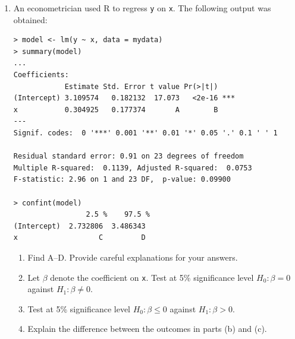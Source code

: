\documentclass[12pt]{article}
\begin{document}
\begin{enumerate}
\begin{verbatim}
> confint(model)
                  2.5 %     97.5 %
(Intercept)   5.084078   5.638654
ln_alcohol   -0.611437  -0.095217
\end{verbatim}
\normalsize
\begin{enumerate}
\item  Several entries in the output were replaced with letters. Find A--D if the number of observations was 21.
 Provide careful explanations for your answers.
\item  What is the interpretation of the coefficient on \verb!ln_alcohol!? Explain.
\item  Test at 5\% significance level $H_0: \beta \geq 0$ against $H_1: \beta<0$, where $\beta$ is the coefficient on \verb!ln_alcohol!.
\end{enumerate}

\item An econometrician used R to regress \verb!y! on \verb!x!. The
following output was obtained:
\small
\begin{verbatim}
> model <- lm(y ~ x, data = mydata)
> summary(model)
...
Coefficients:
            Estimate Std. Error t value Pr(>|t|)
(Intercept) 3.109574   0.182132  17.073   <2e-16 ***
x           0.304925   0.177374       A        B
---
Signif. codes:  0 '***' 0.001 '**' 0.01 '*' 0.05 '.' 0.1 ' ' 1

Residual standard error: 0.91 on 23 degrees of freedom
Multiple R-squared:  0.1139, Adjusted R-squared:  0.0753
F-statistic: 2.96 on 1 and 23 DF,  p-value: 0.09900

> confint(model)
                 2.5 %    97.5 %
(Intercept)  2.732806  3.486343
x                   C         D
\end{verbatim}
\normalsize
\begin{enumerate}
\item Find A--D. Provide careful explanations for your answers.
\item Let $\beta$ denote the coefficient on \verb!x!. Test at
5\% significance level $H_0:\beta=0$ against $H_1:\beta
\ne 0$.
\item Test at 5\% significance level $H_0:\beta \leq 0$ against $H_1:\beta
> 0$.
\item Explain the difference between the outcomes in parts (b)
and (c).
\end{enumerate}


\end{enumerate}
\end{document}
